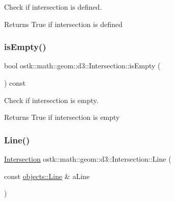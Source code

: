 Check if intersection is defined. 

\begin{DoxyReturn}{Returns}
True if intersection is defined 
\end{DoxyReturn}
\mbox{\label{classostk_1_1math_1_1geom_1_1d3_1_1_intersection_acd2ff7b56469e39e4aefe2681e58cfb7}} 
\subsubsection{\texorpdfstring{is\+Empty()}{isEmpty()}}
{\footnotesize\ttfamily bool ostk\+::math\+::geom\+::d3\+::\+Intersection\+::is\+Empty (\begin{DoxyParamCaption}{ }\end{DoxyParamCaption}) const}



Check if intersection is empty. 

\begin{DoxyReturn}{Returns}
True if intersection is empty 
\end{DoxyReturn}
\mbox{\label{classostk_1_1math_1_1geom_1_1d3_1_1_intersection_a651b8385b994ba358e1422c867e94473}} 
\subsubsection{\texorpdfstring{Line()}{Line()}}
{\footnotesize\ttfamily \hyperlink{classostk_1_1math_1_1geom_1_1d3_1_1_intersection}{Intersection} ostk\+::math\+::geom\+::d3\+::\+Intersection\+::\+Line (\begin{DoxyParamCaption}\item[{const \hyperlink{classostk_1_1math_1_1geom_1_1d3_1_1objects_1_1_line}{objects\+::\+Line} \&}]{a\+Line }\end{DoxyParamCaption})\hspace{0.3cm}{\ttfamily [static]}}




